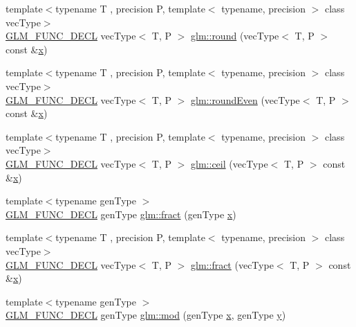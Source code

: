\begin{DoxyCompactItemize}
\item 
{\footnotesize template$<$typename T , precision P, template$<$ typename, precision $>$ class vec\+Type$>$ }\\\mbox{\hyperlink{setup_8hpp_ab2d052de21a70539923e9bcbf6e83a51}{G\+L\+M\+\_\+\+F\+U\+N\+C\+\_\+\+D\+E\+CL}} vec\+Type$<$ T, P $>$ \mbox{\hyperlink{group__core__func__common_gada0165544c0618d634c8056a88082ce9}{glm\+::round}} (vec\+Type$<$ T, P $>$ const \&\mbox{\hyperlink{glad_8h_a92d0386e5c19fb81ea88c9f99644ab1d}{x}})
\item 
{\footnotesize template$<$typename T , precision P, template$<$ typename, precision $>$ class vec\+Type$>$ }\\\mbox{\hyperlink{setup_8hpp_ab2d052de21a70539923e9bcbf6e83a51}{G\+L\+M\+\_\+\+F\+U\+N\+C\+\_\+\+D\+E\+CL}} vec\+Type$<$ T, P $>$ \mbox{\hyperlink{group__core__func__common_ga655598104195a60a950291485e84a97e}{glm\+::round\+Even}} (vec\+Type$<$ T, P $>$ const \&\mbox{\hyperlink{glad_8h_a92d0386e5c19fb81ea88c9f99644ab1d}{x}})
\item 
{\footnotesize template$<$typename T , precision P, template$<$ typename, precision $>$ class vec\+Type$>$ }\\\mbox{\hyperlink{setup_8hpp_ab2d052de21a70539923e9bcbf6e83a51}{G\+L\+M\+\_\+\+F\+U\+N\+C\+\_\+\+D\+E\+CL}} vec\+Type$<$ T, P $>$ \mbox{\hyperlink{group__core__func__common_ga9189b2bec45ff301923ea8f8dd157fb8}{glm\+::ceil}} (vec\+Type$<$ T, P $>$ const \&\mbox{\hyperlink{glad_8h_a92d0386e5c19fb81ea88c9f99644ab1d}{x}})
\item 
{\footnotesize template$<$typename gen\+Type $>$ }\\\mbox{\hyperlink{setup_8hpp_ab2d052de21a70539923e9bcbf6e83a51}{G\+L\+M\+\_\+\+F\+U\+N\+C\+\_\+\+D\+E\+CL}} gen\+Type \mbox{\hyperlink{group__core__func__common_ga8ba89e40e55ae5cdf228548f9b7639c7}{glm\+::fract}} (gen\+Type \mbox{\hyperlink{glad_8h_a92d0386e5c19fb81ea88c9f99644ab1d}{x}})
\item 
{\footnotesize template$<$typename T , precision P, template$<$ typename, precision $>$ class vec\+Type$>$ }\\\mbox{\hyperlink{setup_8hpp_ab2d052de21a70539923e9bcbf6e83a51}{G\+L\+M\+\_\+\+F\+U\+N\+C\+\_\+\+D\+E\+CL}} vec\+Type$<$ T, P $>$ \mbox{\hyperlink{group__core__func__common_ga950ab967a4406f596b7c6c14af091874}{glm\+::fract}} (vec\+Type$<$ T, P $>$ const \&\mbox{\hyperlink{glad_8h_a92d0386e5c19fb81ea88c9f99644ab1d}{x}})
\item 
{\footnotesize template$<$typename gen\+Type $>$ }\\\mbox{\hyperlink{setup_8hpp_ab2d052de21a70539923e9bcbf6e83a51}{G\+L\+M\+\_\+\+F\+U\+N\+C\+\_\+\+D\+E\+CL}} gen\+Type \mbox{\hyperlink{group__core__func__common_ga12201563ef902e3b07e0d1d7656efdb1}{glm\+::mod}} (gen\+Type \mbox{\hyperlink{glad_8h_a92d0386e5c19fb81ea88c9f99644ab1d}{x}}, gen\+Type \mbox{\hyperlink{glad_8h_a66ddd433d2cacfe27f5906b7e86faeed}{y}})

\end{DoxyCompactItemize}
